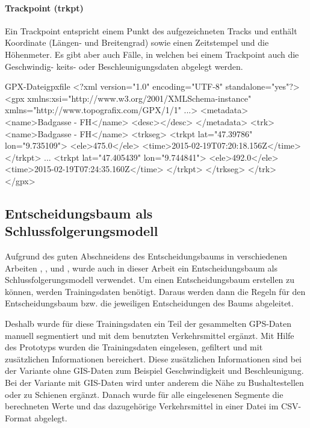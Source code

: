 \paragraph{Trackpoint (trkpt)}
Ein Trackpoint entspricht einem Punkt des aufgezeichneten Tracks und enthält Koordinate (Längen- und Breitengrad) sowie einen Zeitstempel und die Höhenmeter. Es gibt aber auch Fälle, in welchen bei einem Trackpoint auch die Geschwindig- keits- oder Beschleunigungsdaten abgelegt werden.
 
\begin{code}[xml]{GPX-Datei}{gpxfile}
<?xml version="1.0" encoding="UTF-8" standalone="yes"?>
<gpx xmlns:xsi="http://www.w3.org/2001/XMLSchema-instance" xmlns="http://www.topografix.com/GPX/1/1" ...>
    <metadata>
        <name>Badgasse - FH</name>
        <desc></desc>
    </metadata>
    <trk>
        <name>Badgasse - FH</name>
        <trkseg>
            <trkpt lat="47.39786" lon="9.735109">
                <ele>475.0</ele>
                <time>2015-02-19T07:20:18.156Z</time>
            </trkpt>
            ...
            <trkpt lat="47.405439" lon="9.744841">
                <ele>492.0</ele>
                <time>2015-02-19T07:24:35.160Z</time>
            </trkpt>
        </trkseg>
    </trk>
</gpx>
\end{code}
\clearpage

\subsection{Entscheidungsbaum als Schlussfolgerungsmodell}
\label{entscheidungsbaumAlsSchlussfolgerungsmodell}
Aufgrund des guten Abschneidens des Entscheidungsbaums in verschiedenen Arbeiten  \cite{stenneth_transportation_2011}, \cite{reddy_using_2010}, \cite{sebastian_nagel_moglichkeitsstudie_2011}und \cite{zheng_learning_2008}, wurde auch in dieser Arbeit ein Entscheidungsbaum als Schlussfolgerungsmodell verwendet. Um einen Entscheidungsbaum erstellen zu können, werden Trainingsdaten benötigt. Daraus werden dann die Regeln für den Entscheidungsbaum bzw. die jeweiligen Entscheidungen des Baums abgeleitet.

Deshalb wurde für diese Trainingsdaten ein Teil der gesammelten GPS-Daten manuell segmentiert und mit dem benutzten Verkehrsmittel ergänzt. Mit Hilfe des Prototyps wurden die Trainingsdaten eingelesen, gefiltert und mit zusätzlichen Informationen bereichert. Diese zusätzlichen Informationen sind bei der Variante ohne GIS-Daten zum Beispiel Geschwindigkeit und Beschleunigung. Bei der Variante mit GIS-Daten wird unter anderem die Nähe zu Bushaltestellen oder zu Schienen ergänzt. Danach wurde für alle eingelesenen Segmente die berechneten Werte und das dazugehörige Verkehrsmittel in einer Datei im CSV-Format abgelegt. 


